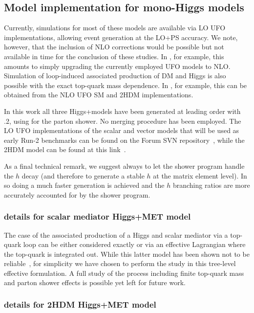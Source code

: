 \subsection{Model implementation for mono-Higgs models}
\label{sub:monoHiggs}

Currently, simulations for most of these models are available via LO UFO implementations, allowing event generation at the 
LO+PS accuracy. We note, however, that the inclusion of NLO corrections would be possible but not available in time for the conclusion of these studies. In \madgraph, for example, this amounts to simply upgrading the currently employed UFO models to NLO. Simulation of  loop-induced associated production of DM and Higgs is also possible with the exact top-quark mass dependence. In \madgraph, for example, this can be obtained from the NLO UFO SM and 2HDM implementations. 

In this work all three Higgs+\MET models have been generated at leading
order with .2, using \pythiaEight for the parton shower. No merging procedure has been employed.
The LO UFO implementations of the scalar and vector models that will be used as early Run-2 benchmarks can be found on the Forum SVN  
repository~\cite{ForumSVN_EWMonoHiggs}, while the 2HDM model can be found at this link~\cite{ForumSVN_EWMonoHiggs_2HDM}.

As a final technical remark, we suggest always to let the shower program handle the  $h$ decay 
(and therefore to generate a stable $h$ at the matrix element level).  
In so doing a much faster generation is achieved and the $h$ branching ratios are more accurately 
accounted for by the shower program. 

\subsubsection{\madgraph details for scalar mediator Higgs+MET model}

The case of the associated production of a Higgs and scalar mediator via a top-quark loop can be either considered 
exactly or via an effective Lagrangian where the top-quark is integrated out. While this latter model has 
been shown not to be reliable~\cite{Haisch:2012kf,Hespel:2014sla,Baur:1989cm}, for simplicity we have chosen to perform
the study in this tree-level effective formulation. A full study of the process including
finite top-quark mass and parton shower effects is possible yet left for future work.

\subsubsection{\madgraph details for 2HDM Higgs+MET model}
\label{sec:monoHImplementation}

